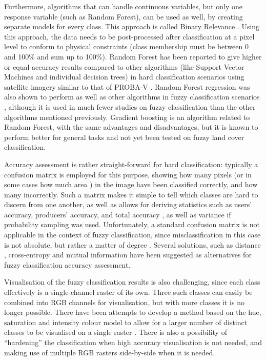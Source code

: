 \documentclass[a4paper,10pt]{article}
\begin{document}
Furthermore, algorithms that can handle continuous variables, but only one response variable (such as Random Forest), can be used as well, by creating separate models for every class. This approach is called Binary Relevance \cite{karalas2016br}. Using this approach, the data needs to be post-processed after classification at a pixel level to conform to physical constraints (class membership must be between 0 and 100\% and sum up to 100\%). Random Forest has been reported to give higher or equal accuracy results compared to other algorithms (like Support Vector Machines and individual decision trees) in hard classification scenarios using satellite imagery similar to that of PROBA-V \cite{duro2012algorithmcomparison}. Random Forest regression was also shown to perform as well as other algorithms in fuzzy classification scenarios \cite{walton2008subpixelrf}, although it is used in much fewer studies on fuzzy classification than the other algorithms mentioned previously. Gradient boosting is an algorithm related to Random Forest, with the same advantages and disadvantages, but it is known to perform better for general tasks \cite{chen2015higgs} and not yet been tested on fuzzy land cover classification.

Accuracy assessment is rather straight-forward for hard classification: typically a confusion matrix is employed for this purpose, showing how many pixels (or in some cases how much area \cite{stehman2009sampling}) in the image have been classified correctly, and how many incorrectly. Such a matrix makes it simple to tell which classes are hard to discern from one another, as well as allows for deriving statistics such as users' accuracy, producers' accuracy, and total accuracy \cite{foody1996fuzzyevaluation}, as well as variance if probability sampling was used. Unfortunately, a standard confusion matrix is not applicable in the context of fuzzy classification, since misclassification in this case is not absolute, but rather a matter of degree \cite{foody2002accuracy}. Several solutions, such as distance \cite{foody1996fuzzyevaluation}, cross-entropy and mutual information \cite{lu2007methods} have been suggested as alternatives for fuzzy classification accuracy assessment.

Visualisation of the fuzzy classification results is also challenging, since each class effectively is a single-channel raster of its own. Three such classes can easily be combined into RGB channels for visualisation, but with more classes it is no longer possible. There have been attempts to develop a method based on the hue, saturation and intensity colour model to allow for a larger number of distinct classes to be visualised on a single raster \cite{hengl2004fuzzycmeans}. There is also a possibility of ``hardening'' the classification when high accuracy visualisation is not needed, and making use of multiple RGB rasters side-by-side when it is needed.
\end{document}
